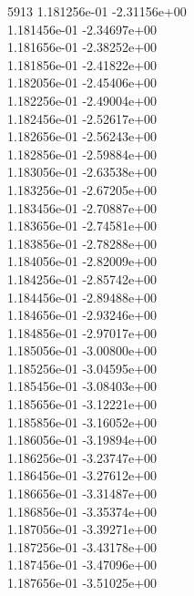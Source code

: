 5913	1.181256e-01	-2.31156e+00	\\ 	1.181456e-01	-2.34697e+00	\\ 	1.181656e-01	-2.38252e+00	\\ 	1.181856e-01	-2.41822e+00	\\ 	1.182056e-01	-2.45406e+00	\\ 	1.182256e-01	-2.49004e+00	\\ 	1.182456e-01	-2.52617e+00	\\ 	1.182656e-01	-2.56243e+00	\\ 	1.182856e-01	-2.59884e+00	\\ 	1.183056e-01	-2.63538e+00	\\ 	1.183256e-01	-2.67205e+00	\\ 	1.183456e-01	-2.70887e+00	\\ 	1.183656e-01	-2.74581e+00	\\ 	1.183856e-01	-2.78288e+00	\\ 	1.184056e-01	-2.82009e+00	\\ 	1.184256e-01	-2.85742e+00	\\ 	1.184456e-01	-2.89488e+00	\\ 	1.184656e-01	-2.93246e+00	\\ 	1.184856e-01	-2.97017e+00	\\ 	1.185056e-01	-3.00800e+00	\\ 	1.185256e-01	-3.04595e+00	\\ 	1.185456e-01	-3.08403e+00	\\ 	1.185656e-01	-3.12221e+00	\\ 	1.185856e-01	-3.16052e+00	\\ 	1.186056e-01	-3.19894e+00	\\ 	1.186256e-01	-3.23747e+00	\\ 	1.186456e-01	-3.27612e+00	\\ 	1.186656e-01	-3.31487e+00	\\ 	1.186856e-01	-3.35374e+00	\\ 	1.187056e-01	-3.39271e+00	\\ 	1.187256e-01	-3.43178e+00	\\ 	1.187456e-01	-3.47096e+00	\\ 	1.187656e-01	-3.51025e+00	\\ \hline
